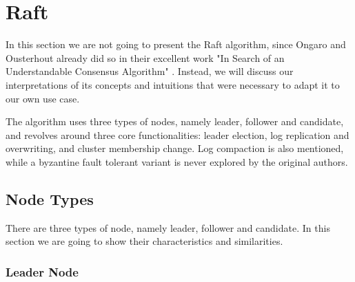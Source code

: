 \section{Raft}

In this section we are not going to present the Raft algorithm, since Ongaro and Ousterhout already did so in their excellent work "In Search of an Understandable Consensus Algorithm" \cite{raft}. Instead, we will discuss our interpretations of its concepts and intuitions that were necessary to adapt it to our own use case.

The algorithm uses three types of nodes, namely leader, follower and candidate, and revolves around three core functionalities: leader election, log replication and overwriting, and cluster membership change. Log compaction is also mentioned, while a byzantine fault tolerant variant is never explored by the original authors.

\subsection{Node Types}

There are three types of node, namely leader, follower and candidate. In this section we are going to show their characteristics and similarities.

\subsubsection{Leader Node}